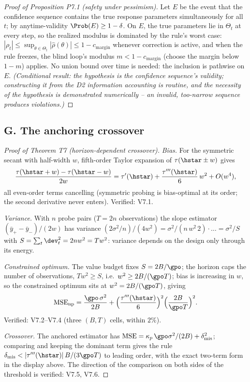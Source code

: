 \begin{proof}[Proof of Proposition P7.1 (safety under pessimism)]
Let $E$ be the event that the confidence sequence contains the true
response parameters simultaneously for all $t$; by anytime-validity
$\Prob(E) \ge 1-\delta$. On $E$, the true parameters lie in $\Theta_t$ at
every step, so the realized modulus is dominated by the rule's worst case:
$|\rho_t| \le \sup_{\theta\in\Theta_t}|\hat\rho(\theta)| \le 1 -
c_{\mathrm{margin}}$ whenever correction is active, and when the rule
freezes, the blind loop's modulus $m < 1 - c_{\mathrm{margin}}$ (choose the
margin below $1 - m$) applies. No union bound over time is needed: the
inclusion is pathwise on $E$. \emph{(Conditional result: the hypothesis is
the confidence sequence's validity; constructing it from the D2
information accounting is routine, and the necessity of the hypothesis is
demonstrated numerically -- an invalid, too-narrow sequence produces
violations.)}
\end{proof}

\subsection*{G. The anchoring crossover}

\begin{proof}[Proof of Theorem T7 (horizon-dependent crossover)]
\emph{Bias.} For the symmetric secant with half-width $w$, fifth-order
Taylor expansion of $\tau(\hstar \pm w)$ gives
\[
\frac{\tau(\hstar + w) - \tau(\hstar - w)}{2w}
 = \tau'(\hstar) + \frac{\tau'''(\hstar)}{6}\,w^2 + O(w^4),
\]
all even-order terms cancelling (symmetric probing is bias-optimal at its
order; the second derivative never enters). Verified: V7.1.

\emph{Variance.} With $n$ probe pairs ($T = 2n$ observations) the slope
estimator $(\bar y_+ - \bar y_-)/(2w)$ has variance
$(2\sigma^2/n)/(4w^2) = \sigma^2/(n\,w^2\,2)\cdot\ldots = \sigma^2/S$ with
$S = \sum_t \dev_t^2 = 2n w^2 = T w^2$: variance depends on the design only
through its energy.

\emph{Constrained optimum.} The value budget fixes $S = 2B/\gpo$; the
horizon caps the number of observations, $T w^2 \ge S$, i.e.\
$w^2 \ge 2B/(\gpo T)$; bias is increasing in $w$, so the constrained
optimum sits at $w^2 = 2B/(\gpo T)$, giving
\[
\mathrm{MSE}_{\mathrm{np}} = \frac{\gpo\,\sigma^2}{2B}
 + \Big(\frac{\tau'''(\hstar)}{6}\Big)^2\Big(\frac{2B}{\gpo T}\Big)^2 .
\]
Verified: V7.2--V7.4 (three $(B, T)$ cells, within $2\%$).

\emph{Crossover.} The anchored estimator has
$\mathrm{MSE} = \kappa_p\,\gpo\sigma^2/(2B) + \delta_{\mathrm{mis}}^2$;
comparing and keeping the dominant term gives the rule
$\delta_{\mathrm{mis}} < |\tau'''(\hstar)|\,B/(3\gpo T)$ to leading order,
with the exact two-term form in the display above. The direction of the
comparison on both sides of the threshold is verified: V7.5, V7.6.
\end{proof}

